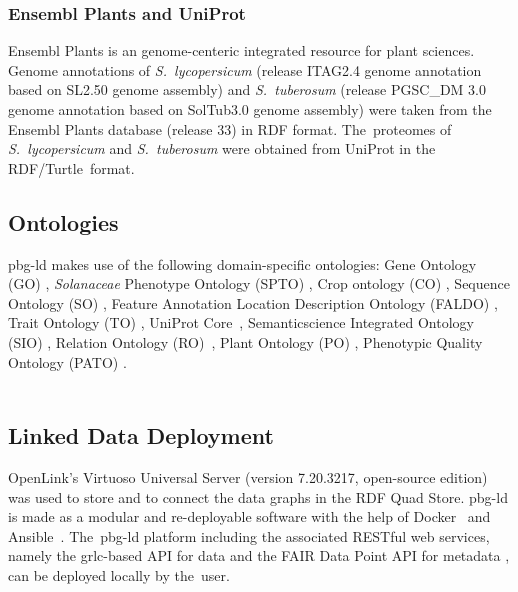 \documentclass[applsci,article,accept,moreauthors,pdftex]{Definitions/mdpi}
\begin{document}
{\subsubsection{Ensembl Plants and UniProt}
Ensembl Plants is an genome-centeric integrated resource for plant sciences.
Genome annotations of \textit{S.~lycopersicum} (release ITAG2.4 genome annotation based on SL2.50 genome assembly) \cite{EnsemblPlants:SL} and \textit{S.~tuberosum} (release PGSC{\_}DM 3.0 genome annotation based on SolTub3.0 genome assembly) were taken from the Ensembl Plants database (release 33) \cite{EnsemblPlants:ST} in RDF format. %
The~proteomes of \textit{S.~lycopersicum} \cite{Uniprot:SL} and \textit{S.~tuberosum} \cite{Uniprot:ST} were obtained from UniProt in the RDF/Turtle~format. %

\subsection{Ontologies}
pbg-ld %
makes use of the following domain-specific ontologies: Gene Ontology (GO) \cite{GO}, %
\textit{Solanaceae} %
Phenotype Ontology (SPTO) \cite{SPTO}, Crop ontology (CO) \cite{CO}, Sequence Ontology (SO) \cite{SO}, %
Feature Annotation Location Description Ontology (FALDO) \cite{FALDO}, %
Trait Ontology (TO) \cite{TO}, %
UniProt Core~\cite{UniprotRDFcore}, %
Semanticscience Integrated Ontology (SIO) \cite{SIO}, %
Relation Ontology (RO)~\cite{RO}, %
Plant Ontology (PO) \cite{PO}, %
Phenotypic Quality Ontology (PATO) \cite{PATO}. %
\\\\


\subsection{Linked Data Deployment}
OpenLink’s Virtuoso Universal Server (version 7.20.3217, open-source edition) was used to store and to connect %
the data graphs in the RDF Quad Store.
pbg-ld %
is made as a modular and re-deployable software with the help of Docker~\cite{boettiger2015introduction} and Ansible~\cite{ansible}. The~pbg-ld platform including the associated RESTful web services, namely the grlc-based API for data and the FAIR Data Point API for metadata \cite{FDP}, %
can be deployed locally by the~user.

}
\end{document}
